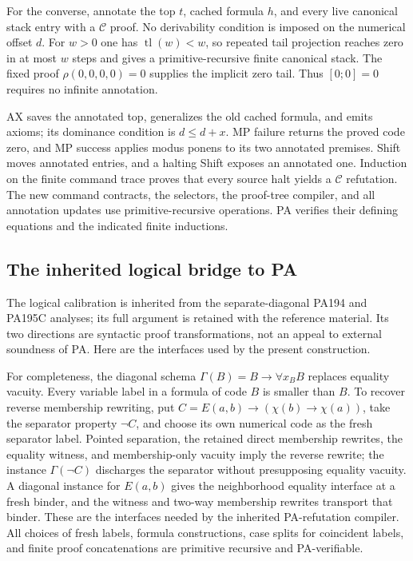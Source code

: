 For the converse, annotate the top $t$, cached formula $h$, and every
live canonical stack entry with a $\mathcal C$ proof.  No derivability
condition is imposed on the numerical offset $d$.  For $w>0$ one has
$\operatorname{tl}(w)<w$, so repeated tail projection reaches zero in
at most $w$ steps and gives a primitive-recursive finite canonical stack.
The fixed proof $\rho(0,0,0,0)=0$ supplies the implicit zero tail.
Thus $[0;0]=0$ requires no infinite annotation.

AX saves the annotated top, generalizes the old cached formula, and emits
axioms; its dominance condition is $d\le d+x$.  MP failure returns
the proved code zero, and MP success applies modus ponens to its two
annotated premises.  Shift moves annotated entries, and a halting Shift
exposes an annotated one.  Induction on the finite command trace proves
that every source halt yields a $\mathcal C$ refutation.  The new command
contracts, the selectors, the proof-tree compiler, and all annotation
updates use primitive-recursive operations.  PA verifies their defining
equations and the indicated finite inductions.

\subsection{The inherited logical bridge to PA}

The logical calibration is inherited from the separate-diagonal PA194 and
PA195C analyses\cite{pa195,pa194,pa195c}; its full argument is retained with the reference material.
Its two directions are syntactic proof transformations, not an appeal to
external soundness of PA.  Here are the interfaces used by the present
construction.

For completeness, the diagonal schema
$\Gamma(B)=B\to\forall x_B B$ replaces equality vacuity.  Every variable
label in a formula of code $B$ is smaller than $B$.  To recover reverse
membership rewriting, put
$C=E(a,b)\to(\chi(b)\to\chi(a))$, take the separator property
$\neg C$, and choose its own numerical code as the fresh separator label.
Pointed separation, the retained direct membership rewrites, the equality
witness, and membership-only vacuity imply the reverse rewrite; the
instance $\Gamma(\neg C)$ discharges the separator without presupposing
equality vacuity.  A diagonal instance for $E(a,b)$ gives the neighborhood
equality interface at a fresh binder, and the witness and two-way
membership rewrites transport that binder.  These are the interfaces
needed by the inherited PA-refutation compiler.  All choices of fresh
labels, formula constructions, case splits for coincident labels, and
finite proof concatenations are primitive recursive and PA-verifiable.

